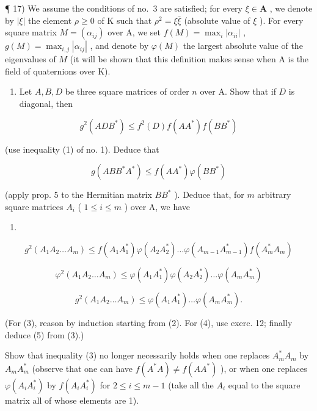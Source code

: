 ¶ 17) We assume the conditions of no.~3 are satisfied; for every \(\xi\in\mathbf{A}\) , we denote by \(|\xi|\) the element \(\rho\geqslant0\) of K such that \(\rho^{2}=\xi\bar{\xi}\) (absolute value of \(\xi\) ). For every square matrix \(M=(\alpha_{ij})\) over A, we set \(f(M)=\max_{i}|\alpha_{ii}|\) , \(g(M)=\max_{i,j}|\alpha_{ij}|\) , and denote by \(\varphi(M)\) the largest absolute value of the eigenvalues of \(M\) (it will be shown that this definition makes sense when A is the field of quaternions over K).

\begin{enumerate}
\def\labelenumi{\alph{enumi})}
\tightlist
\item
  Let \(A, B, D\) be three square matrices of order \(n\) over A. Show that if \(D\) is diagonal, then
\end{enumerate}

\[
g ^ {2} (A D B ^ {*}) \leqslant f ^ {2} (D) f (A A ^ {*}) f (B B ^ {*})\tag{1}
\]

(use inequality (1) of no. 1). Deduce that

\[
g (A B B ^ {*} A ^ {*}) \leqslant f (A A ^ {*}) \varphi (B B ^ {*})\tag{2}
\]

(apply prop. 5 to the Hermitian matrix \(BB^{*}\) ). Deduce that, for \(m\) arbitrary square matrices \(A_{i}\) ( \(1 \leqslant i \leqslant m\) ) over A, we have

\begin{enumerate}
\def\labelenumi{(\arabic{enumi})}
\setcounter{enumi}{2}
\tightlist
\item
\end{enumerate}

\[
g ^ {2} (A _ {1} A _ {2} \dots A _ {m}) \leqslant f (A _ {1} A _ {1} ^ {*}) \varphi (A _ {2} A _ {2} ^ {*}) \dots \varphi (A _ {m - 1} A _ {m - 1} ^ {*}) f (A _ {m} ^ {*} A _ {m})\tag{4}
\]

\[
\varphi^ {2} (A _ {1} A _ {2} \dots A _ {m}) \leqslant \varphi (A _ {1} A _ {1} ^ {*}) \varphi (A _ {2} A _ {2} ^ {*}) \dots \varphi (A _ {m} A _ {m} ^ {*})\tag{5}
\]

\[
g ^ {2} (A _ {1} A _ {2} \dots A _ {m}) \leqslant \varphi (A _ {1} A _ {1} ^ {*}) \dots \varphi (A _ {m} A _ {m} ^ {*}).
\]

(For (3), reason by induction starting from (2). For (4), use exerc. 12; finally deduce (5) from (3).)

Show that inequality (3) no longer necessarily holds when one replaces \(A_{m}^{*}A_{m}\) by \(A_{m}A_{m}^{*}\) (observe that one can have \(f(A^{*}A)\neq f(A A^{*})\) ), or when one replaces \(\varphi(A_{i}A_{i}^{*})\) by \(f(A_{i}A_{i}^{*})\) for \(2\leqslant i\leqslant m-1\) (take all the \(A_{i}\) equal to the square matrix all of whose elements are 1).

